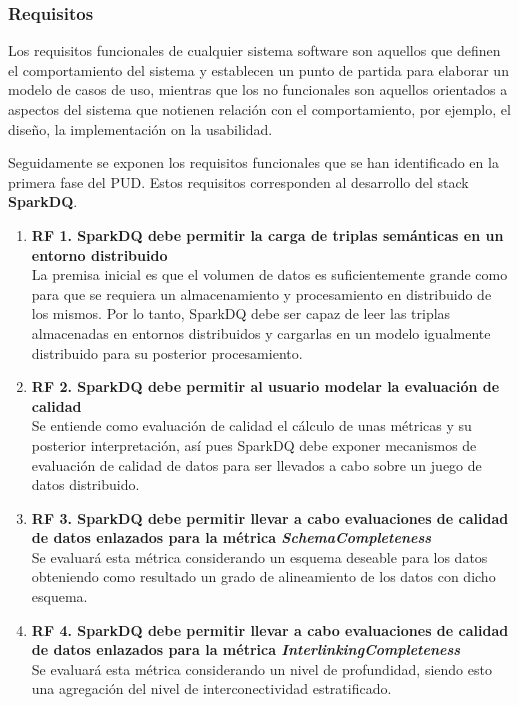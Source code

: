 

\subsubsection{Requisitos}

Los requisitos funcionales de cualquier sistema software son aquellos que definen el comportamiento del
sistema y establecen un punto de partida para elaborar un modelo de casos de
uso, mientras que los no funcionales son aquellos orientados a aspectos del
sistema que notienen relación con el comportamiento, por ejemplo, el diseño, la
implementación on la usabilidad. 

Seguidamente se exponen los requisitos funcionales que se han identificado en la
primera fase del \acs{PUD}. Estos requisitos corresponden al desarrollo del
stack \textbf{SparkDQ}.

\begin{enumerate}
\item \textbf{RF 1. SparkDQ debe permitir la carga de triplas semánticas en un entorno
  distribuido} \\La premisa inicial es que el volumen de datos es
  suficientemente grande como para que se requiera un almacenamiento y
  procesamiento en distribuido de los mismos. Por lo tanto, SparkDQ debe ser
  capaz de leer las triplas almacenadas en entornos distribuidos y cargarlas en
  un modelo igualmente distribuido para su posterior procesamiento.
  
\item \textbf{RF 2. SparkDQ debe permitir al usuario modelar la evaluación de
  calidad}\\Se entiende como evaluación de calidad el cálculo de unas métricas y
  su posterior interpretación, así pues SparkDQ debe exponer mecanismos de
  evaluación de calidad de datos para ser llevados a cabo sobre un juego de
  datos distribuido. 
\item \textbf{RF 3. SparkDQ debe permitir llevar a cabo evaluaciones de calidad de
  datos enlazados para la métrica \textit{SchemaCompleteness}}\\Se evaluará esta
  métrica considerando un esquema deseable para los datos obteniendo como
  resultado un grado de alineamiento de los datos con dicho esquema. 

\item \textbf{RF 4. SparkDQ debe permitir llevar a cabo evaluaciones de calidad de
  datos enlazados para la métrica \textit{InterlinkingCompleteness}}\\Se
  evaluará esta métrica considerando un nivel de profundidad, siendo esto una
  agregación del nivel de interconectividad estratificado. 
\end{enumerate}

